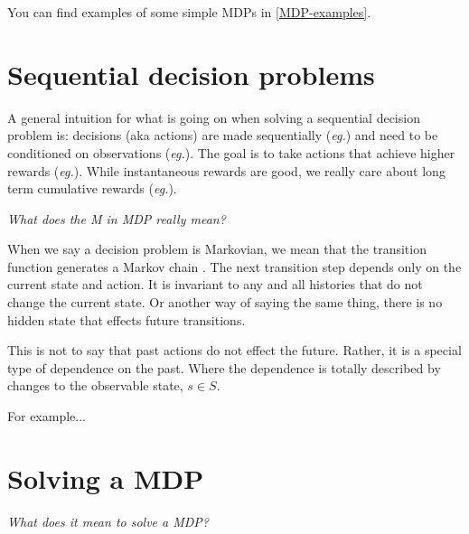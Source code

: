 
You can find examples of some simple MDPs in \ref{MDP-examples}.

\section{Sequential decision problems}

A general intuition for what is going on when solving a sequential decision problem is: decisions (aka actions) are made
sequentially (\textit{eg.}) and need to be conditioned on observations (\textit{eg.}).
The goal is to take actions that achieve higher rewards (\textit{eg.}). While instantaneous
rewards are good, we really care about long term cumulative rewards (\textit{eg.}).


\begin{displayquote}
  \textit{What does the M in MDP really mean?}
\end{displayquote}

When we say a decision problem is Markovian, we mean that the transition
function generates a Markov chain \cite{Markov2006}. The next transition step depends only
on the current state and action. It is invariant to any and all histories that do not
change the current state. Or another way of saying the same thing, there is no hidden state
that effects future transitions.

This is not to say that past actions do not effect the future. Rather,
it is a special type of dependence on the past. Where the dependence is
totally described by changes to the observable state, $s\in S$.

{\color{red}For example...}


\section{Solving a MDP}

\begin{displayquote}
  \textit{What does it mean to solve a MDP?}
\end{displayquote}


